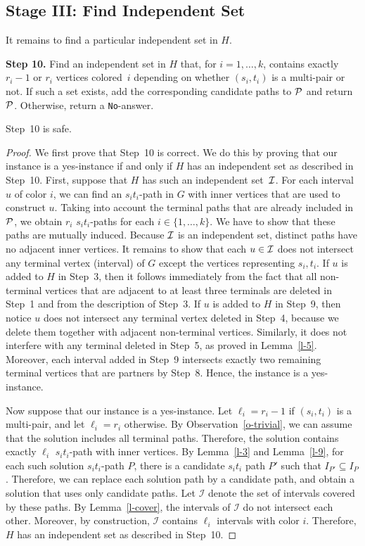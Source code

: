 \documentclass{llncs}
\newcommand{\mc}{\mathcal}
\begin{document}
\subsection{Stage III: Find Independent Set}
It remains to find a particular independent set in $H$.

\medskip
\noindent
{\bf Step 10.} Find an independent set in $H$ that, for $i=1,\ldots, k$, contains exactly $r_i-1$ or $r_i$ vertices colored~$i$ depending on whether $(s_i,t_i)$ is a multi-pair or not. If such a set exists, add the corresponding candidate paths to ${\cal P}$ and return ${\cal P}$. Otherwise, return a {\tt No}-answer.

\begin{lemma}\label{l-10}
Step~10 is safe.
\end{lemma}

\begin{proof}
We first prove that Step~10 is correct.
We do this by proving that our instance is a yes-instance if and only if $H$ has an independent set as described in Step~10.
First, suppose that $H$ has such an independent set~${\cal I}$. For each interval $u$ of color $i$, we can find an $s_it_i$-path in $G$ with inner vertices that are used to construct $u$. Taking into account the terminal paths that are already included in $\cal P$, we obtain $r_i$ $s_it_i$-paths for each $i\in\{1,\ldots,k\}$.  We have to show that these paths are mutually induced. Because $\cal I$ is an independent set, distinct paths have no adjacent inner vertices. It remains to show that each $u\in {\cal I}$ does not intersect any terminal vertex (interval) of $G$ except the vertices representing $s_i,t_i$. If $u$ is added to $H$ in Step~3, then it follows immediately from the fact that all non-terminal vertices that are adjacent to at least three terminals are deleted in Step~1 and from the description of Step~3. If $u$ is added to $H$ in Step~9, then notice $u$ does not intersect any terminal vertex deleted in Step~4, because we delete them together with adjacent non-terminal vertices. Similarly, it does not interfere with any terminal deleted in Step~5, as proved in Lemma~\ref{l-5}. Moreover, each interval added in Step~9 intersects exactly two remaining terminal vertices that are partners by Step~8. Hence, the instance is a yes-instance.

Now suppose that our instance is a yes-instance. Let $\ell_i = r_i-1$ if $(s_i,t_i)$ is a multi-pair, and let $\ell_i = r_i$ otherwise.
By Observation~\ref{o-trivial}, we can assume that the solution includes all terminal paths. Therefore, the solution contains exactly $\ell_i$ $s_it_i$-path with inner vertices. By Lemma~\ref{l-3} and Lemma~\ref{l-9}, for each such solution $s_it_i$-path $P$, there is a candidate $s_it_i$ path $P'$ such that $I_{P'} \subseteq I_{P}$. Therefore, we can replace each solution path by a candidate path, and obtain a solution that uses only candidate paths. Let $\mc{I}$ denote the set of intervals covered by these paths.
By Lemma~\ref{l-cover}, the intervals of $\mc{I}$ do not intersect each other. Moreover, by construction, $\mc{I}$ contains $\ell_i$ intervals with color $i$. Therefore, $H$ has an independent set as described in Step~10.


\end{proof}
\end{document}
